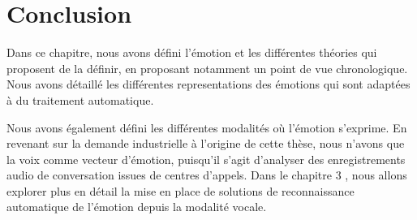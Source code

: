 \section{Conclusion}
Dans ce chapitre, nous avons défini l'émotion et les différentes théories qui proposent de la définir, en proposant notamment un point de vue chronologique. Nous avons détaillé les différentes representations des émotions qui sont adaptées à du traitement automatique.

Nous avons également défini les différentes modalités où l'émotion s'exprime. En revenant sur la demande industrielle à l'origine de cette thèse, nous n'avons que la voix comme vecteur d'émotion, puisqu'il s'agit d'analyser des enregistrements audio de conversation issues de centres d'appels. Dans le chapitre 3
, nous allons explorer plus en détail la mise en place de solutions de reconnaissance automatique de l'émotion depuis la modalité vocale.
